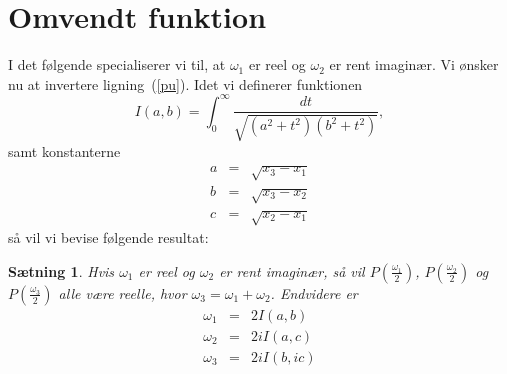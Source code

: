 \documentclass[12pt,oneside,a4paper]{article}
\newcommand{\be}{\begin{equation}}
\newcommand{\ee}{\end{equation}}
\newcommand{\bea}{\begin{eqnarray}}
\newcommand{\eea}{\end{eqnarray}}
\newtheorem{thm}{Sætning}[section]
\begin{document}
\section{Omvendt funktion}
I det følgende specialiserer vi til, at $\omega_1$ er reel og $\omega_2$ er
rent imaginær.  Vi ønsker nu at invertere ligning~(\ref{pu}).  Idet vi
definerer funktionen
\be
I(a, b) = \int_0^\infty \frac{dt}{\sqrt{(a^2+t^2)(b^2+t^2)}},
\ee
samt konstanterne
\bea
a &=& \sqrt{x_3-x_1} \\
b &=& \sqrt{x_3-x_2} \\
c &=& \sqrt{x_2-x_1}
\eea
så vil vi bevise følgende resultat:
\begin{thm}
    Hvis $\omega_1$ er reel og $\omega_2$ er rent imaginær, så vil 
    $P(\frac{\omega_1}{2})$, $P(\frac{\omega_2}{2})$ og $P(\frac{\omega_3}{2})$
    alle være reelle, hvor $\omega_3 = \omega_1 + \omega_2$.
    Endvidere er 
    \bea
    \omega_1 &=& 2 I(a,b) \\
    \omega_2 &=& 2i I(a,c) \\
    \omega_3 &=& 2i I(b,ic)
    \eea
\end{thm}
\end{document}

